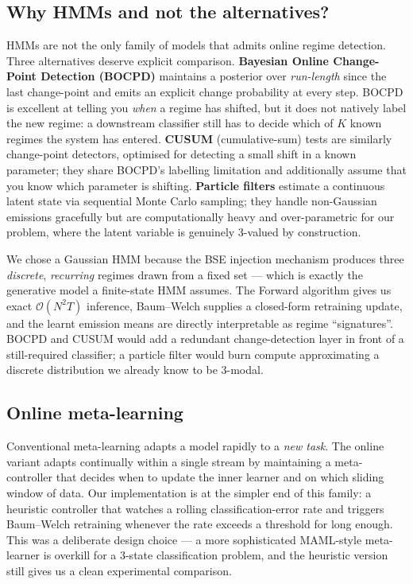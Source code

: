 \documentclass[11pt,a4paper]{article}
\begin{document}
\subsection{Why HMMs and not the alternatives?}\label{sec:alternatives}
HMMs are not the only family of models that admits online regime detection.
Three alternatives deserve explicit comparison. \textbf{Bayesian Online
Change-Point Detection (BOCPD)} \cite{adams2007bocpd} maintains a posterior
over \emph{run-length} since the last change-point and emits an explicit
change probability at every step. BOCPD is excellent at telling you
\emph{when} a regime has shifted, but it does not natively label the new
regime: a downstream classifier still has to decide which of $K$ known
regimes the system has entered. \textbf{CUSUM} (cumulative-sum) tests
\cite{page1954cusum} are similarly change-point detectors, optimised for
detecting a small shift in a known parameter; they share BOCPD's labelling
limitation and additionally assume that you know which parameter is shifting.
\textbf{Particle filters} \cite{doucet2009tutorial} estimate a continuous
latent state via sequential Monte Carlo sampling; they handle non-Gaussian
emissions gracefully but are computationally heavy and over-parametric for
our problem, where the latent variable is genuinely 3-valued by construction.

We chose a Gaussian HMM because the BSE injection mechanism produces three
\emph{discrete}, \emph{recurring} regimes drawn from a fixed set --- which is
exactly the generative model a finite-state HMM assumes. The Forward
algorithm gives us exact $\mathcal{O}(N^2T)$ inference, Baum--Welch supplies
a closed-form retraining update, and the learnt emission means are directly
interpretable as regime ``signatures''. BOCPD and CUSUM would add a redundant
change-detection layer in front of a still-required classifier; a particle
filter would burn compute approximating a discrete distribution we already
know to be 3-modal.

\subsection{Online meta-learning}
Conventional meta-learning \cite{finn2017maml} adapts a model rapidly to a
\emph{new task}. The online variant \cite{finn2019online,javed2019meta}
adapts continually within a single stream by maintaining a meta-controller
that decides when to update the inner learner and on which sliding window of
data. Our implementation is at the simpler end of this family: a heuristic
controller that watches a rolling classification-error rate and triggers
Baum--Welch retraining whenever the rate exceeds a threshold for long enough.
This was a deliberate design choice --- a more sophisticated MAML-style
meta-learner is overkill for a 3-state classification problem, and the
heuristic version still gives us a clean experimental comparison.
\end{document}
